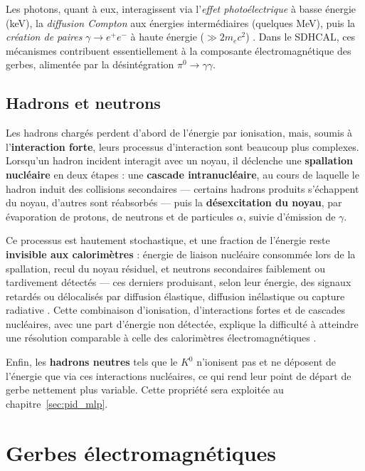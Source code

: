 Les photons, quant à eux, interagissent via l'\textit{effet photoélectrique} à basse énergie (keV),
la \textit{diffusion Compton} aux énergies intermédiaires (quelques MeV), puis la \textit{création
de paires} $\gamma \to e^+e^-$ à haute énergie ($\gg 2 m_e c^2$) \cite{pdg2024}. Dans le SDHCAL, ces
mécanismes contribuent essentiellement à la composante électromagnétique des gerbes, alimentée par
la désintégration $\pi^0 \to \gamma\gamma$.

\subsection{Hadrons et neutrons}

Les hadrons chargés perdent d'abord de l'énergie par ionisation, mais, soumis à l'\textbf{interaction
forte}, leurs processus d'interaction sont beaucoup plus complexes. Lorsqu'un hadron incident
interagit avec un noyau, il déclenche une \textbf{spallation nucléaire} \cite{knoll2010, wigmans2000}
en deux étapes : une \textbf{cascade intranucléaire}, au cours de laquelle le hadron induit des
collisions secondaires — certains hadrons produits s'échappent du noyau, d'autres sont réabsorbés —
puis la \textbf{désexcitation du noyau}, par évaporation de protons, de neutrons et de particules
$\alpha$, suivie d'émission de $\gamma$.

Ce processus est hautement stochastique, et une fraction de l'énergie reste \textbf{invisible aux
calorimètres} : énergie de liaison nucléaire consommée lors de la spallation, recul du noyau
résiduel, et neutrons secondaires faiblement ou tardivement détectés — ces derniers produisant,
selon leur énergie, des signaux retardés ou délocalisés par diffusion élastique, diffusion
inélastique ou capture radiative \cite{knoll2010, leo1994}. Cette combinaison d'ionisation,
d'interactions fortes et de cascades nucléaires, avec une part d'énergie non détectée, explique la
difficulté à atteindre une résolution comparable à celle des calorimètres
électromagnétiques \cite{fabjan2003, wigmans2000}.

Enfin, les \textbf{hadrons neutres} tels que le $K^0$ n'ionisent pas et ne déposent de l'énergie
que via ces interactions nucléaires, ce qui rend leur point de départ de gerbe nettement plus
variable. Cette propriété sera exploitée au chapitre~\ref{sec:pid_mlp}.

\section{Gerbes électromagnétiques}
\label{sec:gerbes-em}

